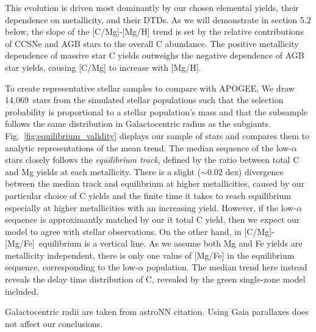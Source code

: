 \documentclass[fleqn,
usenatbib]{mnras}
\newcommand{\nsubgiants}{14,069}
\newcommand{\caafe}{[C/Mg]-[Mg/Fe]}
\newcommand{\dbadd}[1]{{\color{Thistle} #1}}
\begin{document}
This evolution is driven most dominantly by our chosen elemental yields, their
dependence on metallicity, and their DTDs.
As we will demonstrate in section 5.2 below, the slope of the [C/Mg]-[Mg/H] trend is
set by the relative contributions of CCSNe and AGB stars to the overall C abundance.
The positive metallicity dependence of massive star C yields outweighs the negative
dependence of AGB star yields, causing [C/Mg] to increase with [Mg/H].


To create representative stellar samples to compare with APOGEE, 
We draw \nsubgiants\ stars from the simulated stellar populations such that the selection probability is proportional to a stellar population's mass and that the subsample follows the same distribution in Galactocentric radius as the subgiants. 
Fig.~\ref{fig:equilibrium_validity} displays our sample of stars and compares them to analytic representations of the mean trend. 
The median sequence of the low-$\alpha$ stars closely follows the {\it equilibrium track}, defined by the ratio between total C and Mg yields at each metallicity. There is a slight ($\sim{0.02}$ dex) divergence between the median track and equilibrium at higher metallicities, caused by our particular choice of C yields and the finite time it takes to reach equilibrium especially at higher metallicities with an increasing yield. However, if the low-$\alpha$ sequence is approximantly matched by our {it total} C yield, then we expect our model to agree with stellar observations.
On the other hand, in \caafe\ equilibrium is a vertical line. As we assume both Mg and Fe yields are metallicity independent, there is only one value of [Mg/Fe] in the equilibrium sequence, corresponding to the low-$\alpha$ population. The median trend here instead reveals the delay time distribution of C, revealed by the green single-zone model included. 

Galactocentric radii are taken from astroNN {\color{red} citation}. \dbadd{Using Gaia parallaxes does not affect our conclusions.}
\end{document}

